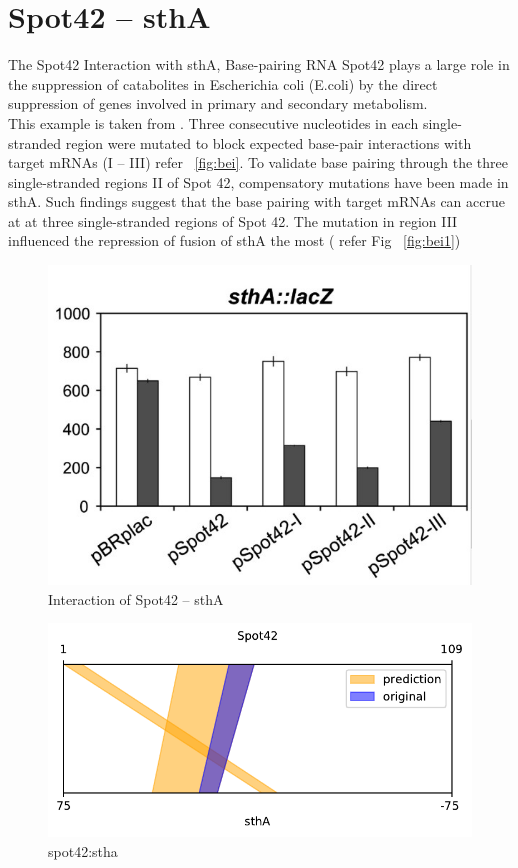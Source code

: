 \documentclass[twoside,a4paper]{report}
\begin{document}
\clearpage
	
	
	
	\section{Spot42 – sthA }
	
	The Spot42 Interaction with sthA, Base-pairing RNA Spot42 plays a large role in the suppression of catabolites in Escherichia coli (E.coli) by the direct suppression of genes involved in primary and secondary metabolism.\\
	
	This example is taken from \citep{beisel2011base}. Three consecutive nucleotides in each single-stranded region were mutated to block expected base-pair interactions with target mRNAs (I – III) refer ~\ref{fig:bei}. To validate base pairing through the three single-stranded regions II of Spot 42, compensatory mutations have been made in sthA. Such findings suggest that the base pairing with target mRNAs can accrue at at three single-stranded regions of Spot 42. The mutation in region III influenced the repression of fusion of sthA the most ( refer Fig ~\ref{fig:bei1})  \\
	
	
	
		\begin{figure}[h!tb]
		\includegraphics[width=0.6\linewidth]{spot42}
		\centering
		\caption{ Interaction of Spot42 – sthA } 
		\label{fig:spot42}
	\end{figure}

	\begin{figure}[h!tb]
		\centering
		\includegraphics[width=.5\linewidth]{rricomparison2}
		\caption{spot42:stha}
		\label{fig:rricomparison2}
	\end{figure}
\end{document}
